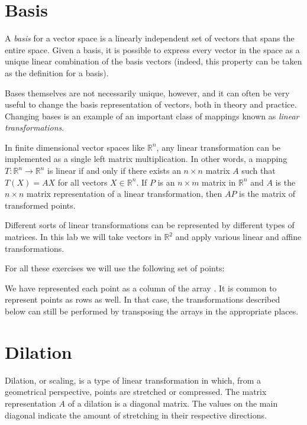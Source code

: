 \label{lab:ChangeBasis}



\section*{Basis}

A \emph{basis} for a vector space is a linearly independent set of vectors that spans the entire space. Given a basis, it is possible to express every vector in the space as a unique linear combination of the basis vectors (indeed, this property can be taken as the definition for a basis).

Bases themselves are not necessarily unique, however, and it can often be very useful to change the basis representation of vectors, both in theory and practice. Changing bases is an example of an important class of mappings known as \emph{linear transformations}.

In finite dimensional vector spaces like $\mathbb{R}^n$, any linear
transformation can be implemented as a single left matrix multiplication.
In other words, a mapping $T : \mathbb{R}^n \to \mathbb{R}^n$ is linear if and only if there exists an $n \times n$ matrix $A$ such that $T\left(X\right) = AX$ for all vectors $X \in \mathbb{R}^n$. If $P$ is an $n \times m$ matrix in $\mathbb{R}^n$ and $A$ is the $n \times n$ matrix representation of a linear transformation, then $AP$ is the matrix of transformed points.

Different sorts of linear transformations can be represented by different types of matrices. In this lab we will take vectors in $\mathbb{R}^2$ and apply various linear and affine transformations.

For all these exercises we will use the following set of points:


We have represented each point as a column of the array .
It is common to represent points as rows as well.
In that case, the transformations described below can still be performed by transposing the arrays in the appropriate places.

\section*{Dilation}
Dilation, or scaling, is a type of linear transformation in which, from a geometrical perspective, points are stretched or compressed.
The matrix representation $A$ of a dilation is a diagonal matrix. The values on the main diagonal indicate the amount of stretching in their respective directions.

